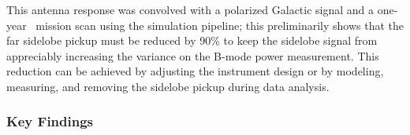 \documentclass[PICOReport.tex]{subfiles}
\begin{document}
This antenna response was convolved with a polarized Galactic signal and a one-year \pico\ mission scan using the simulation pipeline; this preliminarily shows that the far sidelobe pickup must be reduced by 90\%  to keep the sidelobe signal from appreciably increasing the variance on the B-mode power measurement.
This reduction can be achieved by adjusting the instrument design or by modeling, measuring, and removing the sidelobe pickup during data analysis.




\subsubsection{Key Findings}
\label{sec:systematics_key}
\end{document}

